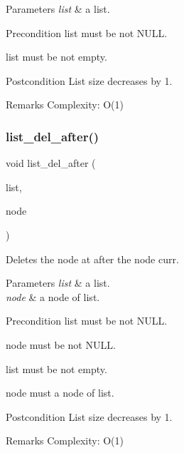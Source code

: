 \begin{DoxyParams}{Parameters}
{\em list} & a list.\\
\hline
\end{DoxyParams}
\begin{DoxyPrecond}{Precondition}
{\ttfamily list} must be not N\+U\+LL. 

{\ttfamily list} must be not empty.
\end{DoxyPrecond}
\begin{DoxyPostcond}{Postcondition}
List size decreases by 1.
\end{DoxyPostcond}
\begin{DoxyRemark}{Remarks}
Complexity\+: O(1) 
\end{DoxyRemark}
\mbox{\label{list_8c_ad301311c004c0b56091e2e89e5a1f5e8}} 
\subsubsection{list\+\_\+del\+\_\+after()}
{\footnotesize\ttfamily void list\+\_\+del\+\_\+after (\begin{DoxyParamCaption}\item[{struct \textbf{ list} $\ast$}]{list,  }\item[{struct \textbf{ list\+\_\+node} $\ast$}]{node }\end{DoxyParamCaption})\hspace{0.3cm}{\ttfamily [inline]}}

Deletes the node at after the node {\ttfamily curr}.


\begin{DoxyParams}{Parameters}
{\em list} & a list. \\
\hline
{\em node} & a node of {\ttfamily list}.\\
\hline
\end{DoxyParams}
\begin{DoxyPrecond}{Precondition}
{\ttfamily list} must be not N\+U\+LL. 

{\ttfamily node} must be not N\+U\+LL. 

{\ttfamily list} must be not empty. 

{\ttfamily node} must a node of {\ttfamily list}.
\end{DoxyPrecond}
\begin{DoxyPostcond}{Postcondition}
List size decreases by 1.
\end{DoxyPostcond}
\begin{DoxyRemark}{Remarks}
Complexity\+: O(1) 
\end{DoxyRemark}
\mbox{\label{list_8c_a1b32056f04fe6cce76bc8774b462598f}} 
